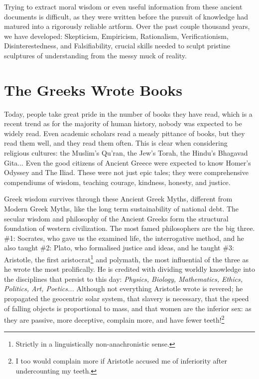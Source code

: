Trying to extract moral wisdom or even useful information from these ancient documents is difficult, as they were written before the pursuit of knowledge had matured into a rigorously reliable artform. Over the past couple thousand years, we have developed: Skepticism, Empiricism, Rationalism, Verificationism, Disinterestedness, and Falsifiability, crucial skills needed to sculpt pristine sculptures of understanding from the messy muck of reality.

\section{The Greeks Wrote Books}

Today, people take great pride in the number of books they have read, which is a recent trend as for the majority of human history, nobody was expected to be widely read. Even academic scholars read a measly pittance of books, but they read them well, and they read them often. This is clear when considering religious cultures: the Muslim's Qu'ran, the Jew's Torah, the Hindu's Bhagavad Gita... Even the good citizens of Ancient Greece were expected to know Homer's Odyssey and The Iliad. These were not just epic tales; they were comprehensive compendiums of wisdom, teaching courage, kindness, honesty, and justice. 

Greek wisdom survives through these Ancient Greek Myths, different from Modern Greek Myths, like the long term sustainability of national debt. The secular wisdom and philosophy of the Ancient Greeks form the structural foundation of western civilization. The most famed philosophers are the big three. \#1: Socrates, who gave us the examined life, the interrogative method, and he also taught \#2: Plato, who formalised justice and ideas, and he taught \#3: Aristotle, the first aristocrat\footnote{Strictly in a linguistically non-anachronistic sense.} and polymath, the most influential of the three as he wrote the most prolifically. He is credited with dividing worldly knowledge into the disciplines that persist to this day: \textit{Physics, Biology, Mathematics, Ethics, Politics, Art, Poetics...} Although not everything Aristotle wrote is revered; he propagated the geocentric solar system, that slavery is necessary, that the speed of falling objects is proportional to mass, and that women are the inferior sex: as they are passive, more deceptive, complain more, and have fewer teeth!\footnote{I too would complain more if Aristotle accused me of inferiority after undercounting my teeth.}

